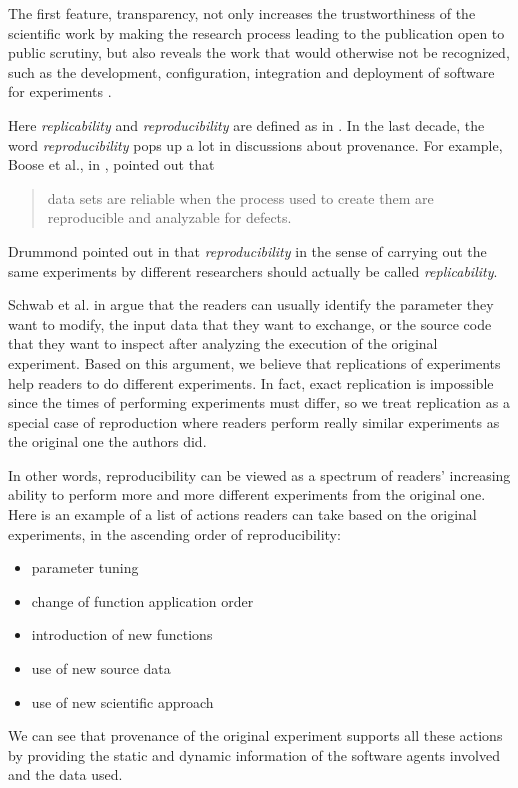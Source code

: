 The first feature, transparency, not only increases the trustworthiness of the scientific work by making the research process leading to the publication open to public scrutiny, but also reveals the work that would otherwise not be recognized, such as the development, configuration, integration and deployment of software for experiments \cite{goble2014better}.

Here \emph{replicability} and \emph{reproducibility} are defined as in \cite{drummond2009replicability}. In the last decade, the word \emph{reproducibility} pops up a lot in discussions about provenance. For example, 
Boose et al., in \cite{boose2007ensuring}, pointed out that
\begin{quote}data sets are reliable when the process used to create them are reproducible and analyzable for defects.\end{quote}
Drummond pointed out in \cite{drummond2009replicability} that \emph{reproducibility} in the sense of carrying out the same experiments by different researchers should actually be called \emph{replicability}.

Schwab et al. in \cite{schwab2000making} argue that the readers can usually identify the parameter they want to modify, the input data that they want to exchange, or the source code that they want to inspect after analyzing the execution of the original experiment. Based on this argument, we believe that replications of experiments help readers to do different experiments. In fact, exact replication is impossible since the times of performing experiments must differ, so we treat replication as a special case of reproduction where readers perform really similar experiments as the original one the authors did.

In other words, reproducibility can be viewed as a spectrum of readers' increasing ability to perform more and more different experiments from the original one. Here is an example of a list of actions readers can take based on the original experiments, in the ascending order of reproducibility:
\begin{itemize}
\item parameter tuning
\item change of function application order
\item introduction of new functions
\item use of new source data
\item use of new scientific approach
\end{itemize}
We can see that provenance of the original experiment supports all these actions by providing the static and dynamic information of the software agents involved and the data used.


